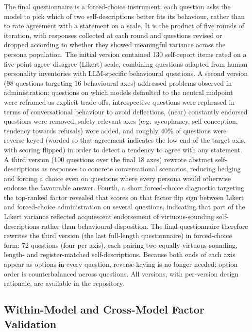 The final questionnaire is a forced-choice instrument: each question asks the model to pick which of two self-descriptions better fits its behaviour, rather than to rate agreement with a statement on a scale. It is the product of five rounds of iteration, with responses collected at each round and questions revised or dropped according to whether they showed meaningful variance across the persona population. The initial version contained 130 self-report items rated on a five-point agree--disagree (Likert) scale, combining questions adapted from human personality inventories with LLM-specific behavioural questions. A second version (98 questions targeting 16 behavioural axes) addressed problems observed in administration: questions on which models defaulted to the neutral midpoint were reframed as explicit trade-offs, introspective questions were rephrased in terms of conversational behaviour to avoid deflections, (near) constantly endorsed questions were removed, safety-relevant axes (e.g.\ sycophancy, self-conception, tendency towards refusals) were added, and roughly $40\%$ of questions were reverse-keyed (worded so that agreement indicates the low end of the target axis, with scoring flipped) in order to detect a tendency to agree with any statement. A third version (100 questions over the final 18 axes) rewrote abstract self-descriptions as responses to concrete conversational scenarios, reducing hedging and forcing a choice even on questions where every persona would otherwise endorse the favourable answer. Fourth, a short forced-choice diagnostic targeting the top-ranked factor revealed that scores on that factor flip sign between Likert and forced-choice administration on several questions, indicating that part of the Likert variance reflected acquiescent endorsement of virtuous-sounding self-descriptions rather than behavioural disposition. The final questionnaire therefore rewrites the third version (the last full-length questionnaire) in forced-choice form: 72 questions (four per axis), each pairing two equally-virtuous-sounding, length- and register-matched self-descriptions. Because both ends of each axis appear as options in every question, reverse-keying is no longer needed; option order is counterbalanced across questions. All versions, with per-version design rationale, are available in the repository.

\subsection{Within-Model and Cross-Model Factor Validation}\label{sec:appendix-fa-validation}

